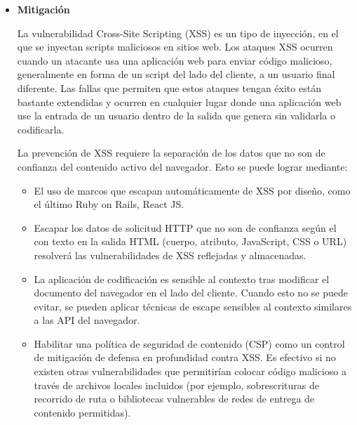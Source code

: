 \documentclass[12pt,oneside,a4paper]{book}
\begin{document}
\begin{enumerate}
\begin{itemize}
	\item 	\textbf{Mitigación}

\vspace{1em}

\hspace{20pt}
La vulnerabilidad Cross-Site Scripting (XSS) es un tipo de inyección, en el que se inyectan scripts maliciosos en sitios web. Los ataques XSS ocurren cuando un atacante usa una aplicación web para enviar código malicioso, generalmente en forma de un script del lado del cliente, a un usuario final diferente. Las fallas que permiten que estos ataques tengan éxito están bastante extendidas y ocurren en cualquier lugar donde una aplicación web use la entrada de un usuario dentro de la salida que genera sin validarla o codificarla.

\vspace{1em}

\hspace{20pt}
La prevención de XSS requiere la separación de los datos que no son de confianza del contenido activo del navegador. Esto se puede lograr mediante:

\vspace{1em}

\begin{itemize}
\item El uso de marcos que escapan automáticamente de XSS por diseño, como el último Ruby on Rails, React JS.
\item Escapar los datos de solicitud HTTP que no son de confianza según el con texto en la salida HTML (cuerpo, atributo, JavaScript, CSS o URL) resolverá las
 vulnerabilidades de XSS reflejadas y almacenadas.
 \item  La aplicación de codificación es sensible al contexto tras modificar el documento del navegador en el lado del cliente. Cuando esto no se puede evitar, se pueden aplicar técnicas de escape sensibles al contexto similares a las API del navegador.
\item Habilitar una política de seguridad de contenido (CSP) como un control de mitigación de defensa en profundidad contra XSS. Es efectivo si no existen otras vulnerabilidades que permitirían colocar código malicioso a través de archivos locales incluidos (por ejemplo, sobrescrituras de recorrido de ruta o bibliotecas vulnerables de redes de entrega de contenido permitidas).
\end{itemize}
\end{itemize}


\end{enumerate}
\end{document}
